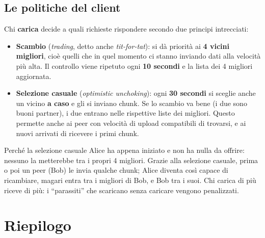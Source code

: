 \subsection{Le politiche del client}


Chi \textbf{carica} decide a quali richieste rispondere secondo due principi intrecciati:

\begin{itemize}
    \item \textbf{Scambio} (\emph{trading}, detto anche \emph{tit-for-tat}): si dà priorità ai
          \textbf{4 vicini migliori}, cioè quelli che in quel momento ci stanno inviando dati alla velocità più
          alta. Il controllo viene ripetuto ogni \textbf{10 secondi} e la lista dei 4 migliori aggiornata.
    \item \textbf{Selezione casuale} (\emph{optimistic unchoking}): ogni \textbf{30 secondi} si sceglie anche un
          vicino \textbf{a caso} e gli si inviano chunk. Se lo scambio va bene (i due sono buoni partner), i due
          entrano nelle rispettive liste dei migliori. Questo permette anche ai peer con velocità di upload
          compatibili di trovarsi, e ai nuovi arrivati di ricevere i primi chunk.
\end{itemize}

\begin{esempio}{Perché la selezione casuale}
Alice ha appena iniziato e non ha nulla da offrire: nessuno la metterebbe tra i propri 4 migliori. Grazie
alla selezione casuale, prima o poi un peer (Bob) le invia qualche chunk; Alice diventa così capace di
ricambiare, magari entra tra i migliori di Bob, e Bob tra i suoi. Chi carica di più riceve di più: i
``parassiti'' che scaricano senza caricare vengono penalizzati.
\end{esempio}

\section{Riepilogo}


